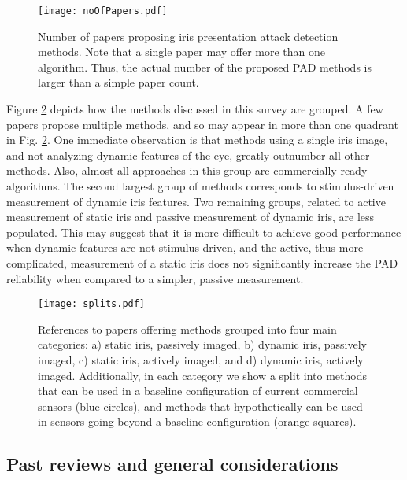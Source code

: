 \documentclass[format=acmsmall, review=false, timestamp=false]{acmart}
\begin{document}
\begin{figure}[!htb]
    \centering
    \texttt{[image: noOfPapers.pdf]}
    \caption{Number of papers proposing iris presentation attack detection methods. Note that a single paper may offer more than one algorithm{.} Thus, the actual number of the proposed PAD methods is larger than a simple paper count.}
    \label{fig:noOfPapers}
\end{figure}

Figure \ref{fig:splits} depicts how the methods discussed in this survey are grouped. A few papers propose multiple methods, and so may appear in more than one quadrant in Fig. \ref{fig:splits}. One immediate observation is that methods using a single iris image, and not analyzing dynamic features of the eye, greatly outnumber all other {methods}. Also, almost all approaches in this group are commercially-ready algorithms. The second largest group of methods corresponds to stimulus-driven measurement of dynamic iris features. Two remaining groups, related to active measurement of static iris and passive measurement of dynamic iris, are less populated. This may suggest that it is more difficult to achieve good performance when dynamic features are not stimulus-driven, and the active, thus more complicated, measurement of a static iris does not significantly increase the PAD reliability when compared to a simpler, passive measurement.

\begin{figure}[!htb]
    \centering
    \texttt{[image: splits.pdf]}
    \caption{References to papers offering methods grouped into four main categories: a) static iris, passively imaged, b) dynamic iris, passively imaged, c) static iris, actively imaged, and d) dynamic iris, actively imaged. Additionally, in each category we show a split into methods that can be used in a baseline configuration of current commercial sensors (blue circles), and methods that hypothetically can be used in sensors going beyond a baseline configuration ({orange} squares).}
    \label{fig:splits}
\end{figure}


\subsection{Past reviews and general considerations}
\label{sec:PADmethods_General}
\end{document}
